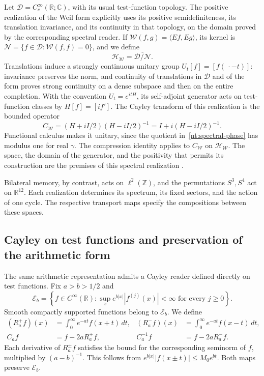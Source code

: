 Let \(\mathcal D=C_c^\infty(\mathbb R;\mathbb C)\), with its usual
test-function topology. The positive realization of the Weil
form explicitly uses its positive semidefiniteness, its
translation invariance, and its continuity in that topology, on the
domain proved by the corresponding spectral reader. If
\(\mathscr W(f,g)=\langle Ef,Eg\rangle\), its kernel is
\(\mathcal N=\{f\in\mathcal D:\mathscr W(f,f)=0\}\), and we define
\[
 \mathcal H_{\mathscr W}
 =\overline{\mathcal D/\mathcal N}.
\]
Translations induce a strongly continuous unitary
group \(U_t[f]=[f(\,\cdot-t)]\): invariance preserves the norm,
and continuity of translations in \(\mathcal D\) and of the form
proves strong continuity on a dense subspace and then on
the entire completion. With the convention
\(U_t=e^{itH}\), its self-adjoint generator acts on
test-function classes by \(H[f]=[if']\). The Cayley transform of
this realization is the bounded operator
\begin{equation}
 C_{\mathscr W}
 =(H+iI/2)(H-iI/2)^{-1}
 =I+i(H-iI/2)^{-1}.
 \label{nt:cayley-hilbert}
\end{equation}
Functional calculus makes it unitary, since the quotient
in~\eqref{nt:spectral-phase} has modulus one for
real \(\gamma\). The compression identity applies
to \(C_{\mathscr W}\) on \(\mathcal H_{\mathscr W}\).
The space, the domain of the generator, and the positivity
that permits its construction are the premises of this
spectral realization \cite{HMT-VIII}.

Bilateral memory, by contrast, acts on
\(\ell^2(\mathbb Z)\), and the permutations \(S^3,S^4\)
act on \(\mathbb R^{12}\). Each realization determines
its spectrum, its fixed sectors, and the action of one cycle.
The respective transport maps specify the
compositions between these spaces.

\subsection{Cayley on test functions and preservation of the arithmetic form}

The same arithmetic representation admits a Cayley reader
defined directly on test functions. Fix
\(a>b>1/2\) and
\[
 \mathscr E_b=
 \left\{f\in C^\infty(\mathbb R):
   \sup_x e^{b|x|}|f^{(j)}(x)|<\infty
   \text{ for every }j\geq0\right\}.
\]
Smooth compactly supported functions belong to
\(\mathscr E_b\). We define
\begin{align}
 (R_a^+f)(x)&=\int_0^\infty e^{-at}f(x+t)\,dt,
 &(R_a^-f)(x)&=\int_0^\infty e^{-at}f(x-t)\,dt,\label{nt:resolvents}\\
 C_af&=f-2aR_a^+f,
 &C_a^{-1}f&=f-2aR_a^-f.\label{nt:test-cayley}
\end{align}
Each derivative of \(R_a^\pm f\) satisfies the bound for the
corresponding seminorm of \(f\), multiplied by
\((a-b)^{-1}\). This follows from
\(e^{b|x|}|f(x\pm t)|\leq M_0e^{bt}\).
Both maps preserve \(\mathscr E_b\).

